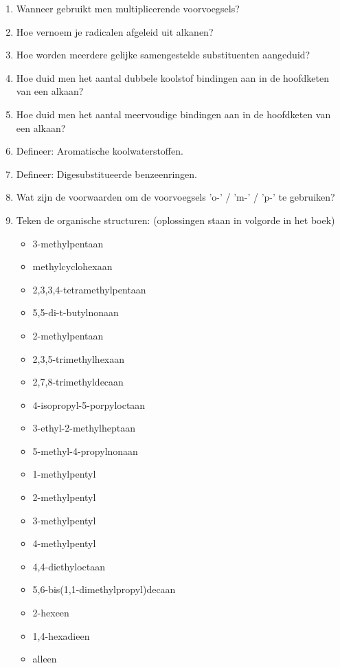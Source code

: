 \documentclass[a4paper,12pt]{article}
\begin{document}
\begin{enumerate}
        \item Wanneer gebruikt men multiplicerende voorvoegsels?
        \item Hoe vernoem je radicalen afgeleid uit alkanen?
        \item Hoe worden meerdere gelijke samengestelde substituenten aangeduid? 
        \item Hoe duid men het aantal dubbele koolstof bindingen aan in de hoofdketen van een alkaan?
        \item Hoe duid men het aantal meervoudige bindingen aan in de hoofdketen van een alkaan? 
        \item Defineer: Aromatische koolwaterstoffen. 
        \item Defineer: Digesubstitueerde benzeenringen. 
        \item Wat zijn de voorwaarden om de voorvoegsels 'o-' / 'm-' / 'p-' te gebruiken?
        \item Teken de organische structuren: (oplossingen staan in volgorde in het boek)
            \begin{itemize}
                \item 3-methylpentaan
                \item methylcyclohexaan
                \item 2,3,3,4-tetramethylpentaan
                \item 5,5-di-t-butylnonaan
                \item 2-methylpentaan
                \item 2,3,5-trimethylhexaan
                \item 2,7,8-trimethyldecaan
                \item 4-isopropyl-5-porpyloctaan
                \item 3-ethyl-2-methylheptaan
                \item 5-methyl-4-propylnonaan
                \item 1-methylpentyl
                \item 2-methylpentyl
                \item 3-methylpentyl
                \item 4-methylpentyl
                \item 4,4-diethyloctaan
                \item 5,6-bis(1,1-dimethylpropyl)decaan
                \item 2-hexeen
                \item 1,4-hexadieen
                \item alleen 

\end{itemize}
\end{enumerate}
\end{document}
